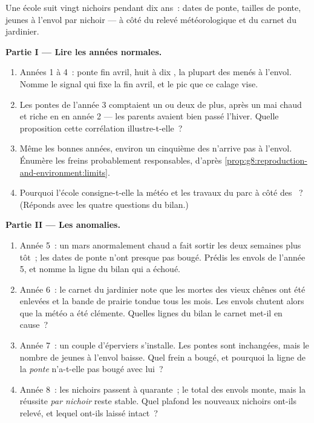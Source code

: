 \begin{problem}\label{pb:g8:reproduction-and-environment:1}
Une école suit vingt nichoirs pendant dix ans~: dates de ponte,
tailles de ponte, jeunes à l'envol par nichoir --- à côté du relevé
météorologique et du carnet du jardinier.

\medskip\noindent\textbf{Partie I --- Lire les années
normales.}
\begin{enumerate}
  \item Années 1 à 4~: ponte fin avril, huit à dix , la plupart
        des  menés à l'envol. Nomme le signal qui fixe la fin
        avril, et le pic que ce calage vise.
  \item Les pontes de l'année 3 comptaient un ou deux  de plus,
        après un mai chaud et riche en  en année 2 --- les
        parents avaient bien passé l'hiver. Quelle proposition cette
        corrélation illustre-t-elle~?
  \item Même les bonnes années, environ un cinquième des 
        n'arrive pas à l'envol. Énumère les freins probablement
        responsables, d'après
        \cref{prop:g8:reproduction-and-environment:limits}.
  \item Pourquoi l'école consigne-t-elle la météo et les travaux du
        parc à côté des ~? (Réponds avec les quatre questions
        du bilan.)
\end{enumerate}

\medskip\noindent\textbf{Partie II --- Les anomalies.}
\begin{enumerate}[resume]
  \item Année 5~: un mars anormalement chaud a fait sortir les
         deux semaines plus tôt~; les dates de ponte n'ont
        presque pas bougé. Prédis les envols de l'année 5, et nomme
        la ligne du bilan qui a échoué.
  \item Année 6~: le carnet du jardinier note que les 
        mortes des vieux chênes ont été enlevées et la bande de
        prairie tondue tous les mois. Les envols chutent alors que
        la météo a été clémente. Quelles lignes du bilan le carnet
        met-il en cause~?
  \item Année 7~: un couple d'éperviers s'installe. Les pontes sont
        inchangées, mais le nombre de jeunes à l'envol baisse. Quel
        frein a bougé, et pourquoi la ligne de la \emph{ponte} n'a-t-elle
        pas bougé avec lui~?
  \item Année 8~: les nichoirs passent à quarante~; le total des
        envols monte, mais la réussite \emph{par nichoir} reste
        stable. Quel plafond les nouveaux nichoirs ont-ils relevé,
        et lequel ont-ils laissé intact~?
\end{enumerate}


\end{problem}
